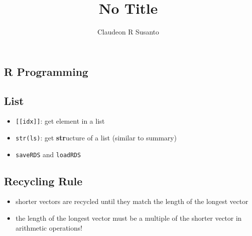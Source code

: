 \documentclass{article}
\title{No Title}
\author{Claudeon R Susanto}
\date{}
\begin{document}
{}\selectfont
\begin{multicols}{2}
\section{R Programming}
\subsection*{List}
\begin{itemize}
	\item \texttt{[[idx]]}: get element in a list
	\item \texttt{str(ls)}: get \textbf{str}ucture of a list (similar to summary)
	\item \texttt{saveRDS} and \texttt{loadRDS}
\end{itemize}
\subsection*{Recycling Rule}
\begin{itemize}
	\item shorter vectors are recycled until they match the length of the longest vector
	\item the length of the longest vector must be a multiple of the shorter vector in arithmetic operations!
\end{itemize}

\end{multicols}
\end{document}
